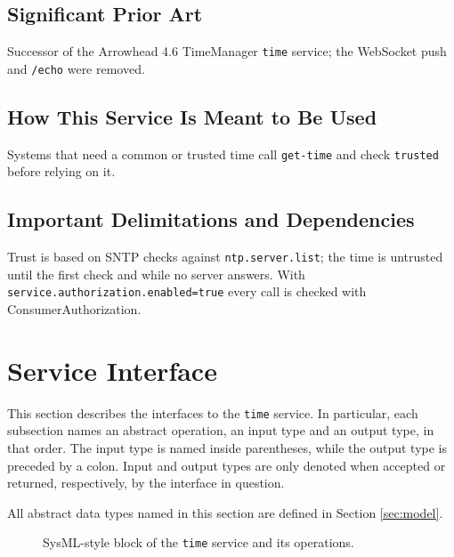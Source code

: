 \documentclass[a4paper]{arrowhead}
\begin{document}
\subsection{Significant Prior Art}

Successor of the Arrowhead 4.6 TimeManager \texttt{time} service; the WebSocket push and \texttt{/\allowbreak{}echo} were removed.

\subsection{How This Service Is Meant to Be Used}

Systems that need a common or trusted time call \texttt{get-\allowbreak{}time} and check \texttt{trusted} before relying on it.

\subsection{Important Delimitations and Dependencies}
\label{sec:delimitations}

Trust is based on SNTP checks against \texttt{ntp.\allowbreak{}server.\allowbreak{}list}; the time is untrusted until the first check and while no server answers. With \texttt{service.\allowbreak{}authorization.\allowbreak{}enabled=\allowbreak{}true} every call is checked with Consumer\allowbreak{}Authorization.

\newpage

\section{Service Interface}
\label{sec:operations}

This section describes the interfaces to the \texttt{time} service.
In particular, each subsection names an abstract operation, an input type and an output type, in that order.
The input type is named inside parentheses, while the output type is preceded by a colon.
Input and output types are only denoted when accepted or returned, respectively, by the interface in question.

All abstract data types named in this section are defined in Section \ref{sec:model}.

\begin{figure}[ht!]
  \centering
  \caption{SysML-style block of the \texttt{time} service and its operations.}
  \label{fig:SD}
\end{figure}
\end{document}
